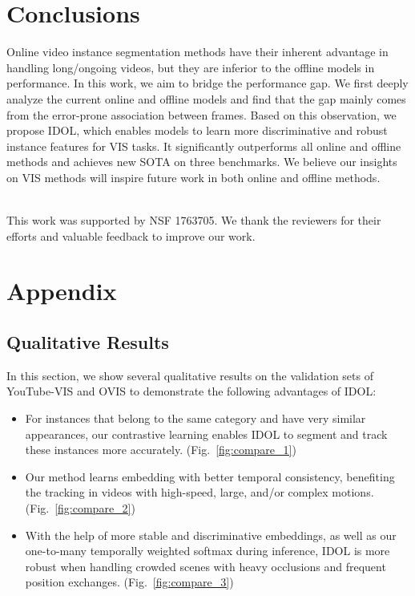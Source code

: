 \documentclass[runningheads]{llncs}
\begin{document}
\section{Conclusions}

Online video instance segmentation methods have their inherent advantage in handling long/ongoing videos, but they are inferior to the offline models in performance. In this work, we aim to bridge the performance gap. We first deeply analyze the current online and offline models and find that the gap mainly comes from the error-prone association between frames. Based on this observation, we propose IDOL, which enables models to learn more discriminative and robust instance features for VIS tasks. It significantly outperforms all online and offline methods and achieves new SOTA on three benchmarks. We believe our insights on VIS methods will inspire future work in both online and offline methods.

~\\
This work was supported by NSF 1763705.
We thank the reviewers for their efforts and valuable feedback to improve our work.

\clearpage




\clearpage
\appendix
\section{Appendix}













\subsection{Qualitative Results}
\label{Sup:Qua}

In this section, we show several qualitative results on the validation sets of YouTube-VIS and OVIS to demonstrate the following advantages of IDOL:
\begin{itemize}

\item For instances that belong to the same category and have very similar appearances, our contrastive learning enables IDOL to segment and track these instances more accurately. (\eg Fig.~\ref{fig:compare_1})

\item Our method learns embedding with better temporal consistency, benefiting the tracking in videos with high-speed, large, and/or complex motions. (\eg Fig.~\ref{fig:compare_2})

\item With the help of more stable and discriminative embeddings, as well as our one-to-many temporally weighted softmax during inference, IDOL is more robust when handling crowded scenes with heavy occlusions and frequent position exchanges. (\eg Fig.~\ref{fig:compare_3})

\end{itemize}
\end{document}
